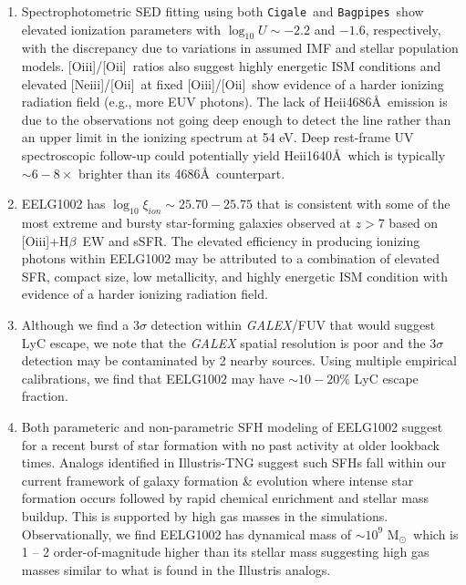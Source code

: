 \documentclass[twocolumn,tight,times,linenumbers]{aastex631}
\newcommand{\hbeta}{H$\beta$}
\newcommand{\heii}{He{\sc ii}}
\newcommand{\oii}{[O{\sc ii}]}
\newcommand{\oiii}{[O{\sc iii}]}
\newcommand{\neiii}{[Ne{\sc iii}]}
\newcommand{\msol}{M$_\odot$}
\newcommand{\xiion}{$\xi_{ion}$}
\newcommand{\cigale}{\texttt{Cigale}}
\newcommand{\bagpipes}{\texttt{Bagpipes}}
\begin{document}
\begin{enumerate}[nolistsep,label=(\roman*)]
			\item Spectrophotometric SED fitting using both \cigale~and \bagpipes~show elevated ionization parameters with $\log_{10} U \sim -2.2$ and $-1.6$, respectively, with the discrepancy due to variations in assumed IMF and stellar population models. \oiii/\oii~ratios also suggest highly energetic ISM conditions and elevated \neiii/\oii~at fixed \oiii/\oii~show evidence of a harder ionizing radiation field (e.g., more EUV photons).  The lack of \heii4686\AA~emission is due to the observations not going deep enough to detect the line rather than an upper limit in the ionizing spectrum at 54 eV. Deep rest-frame UV spectroscopic follow-up could potentially yield \heii1640\AA~which is typically $\sim 6 - 8 \times$ brighter than its 4686\AA~counterpart.
			
			\item EELG1002 has $\log_{10} \textrm{\xiion} \sim 25.70 - 25.75$ that is consistent with some of the most extreme and bursty star-forming galaxies observed at $z > 7$ based on \oiii+\hbeta~EW and sSFR. The elevated efficiency in producing ionizing photons within EELG1002 may be attributed to a combination of elevated SFR, compact size, low metallicity, and highly energetic ISM condition with evidence of a harder ionizing radiation field. 
			
			\item Although we find a $3\sigma$ detection within \textit{GALEX}/FUV that would suggest LyC escape, we note that the \textit{GALEX} spatial resolution is poor and the $3\sigma$ detection may be contaminated by 2 nearby sources. Using multiple empirical calibrations, we find that EELG1002 may have $\sim 10 - 20\%$ LyC escape fraction.

			\item Both parameteric and non-parametric SFH modeling of EELG1002 suggest for a recent burst of star formation with no past activity at older lookback times. Analogs identified in Illustris-TNG suggest such SFHs fall within our current framework of galaxy formation \& evolution where intense star formation occurs followed by rapid chemical enrichment and stellar mass buildup. This is supported by high gas masses in the simulations. Observationally, we find EELG1002 has dynamical mass of $\sim 10^9$ \msol~which is 1 -- 2 order-of-magnitude higher than its stellar mass suggesting high gas masses similar to what is found in the Illustris analogs.
		\end{enumerate}
		
\end{document}
